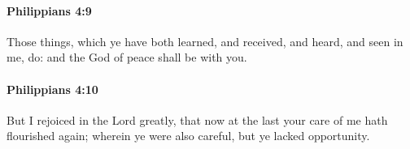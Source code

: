 		\paragraph{Philippians 4:9} %
			\label{PHILIPPIANS-4-9}

			Those things, which ye have both learned, and received, and heard, and seen in me, do: and the God of peace shall be with you.

			\begin{framed}
			\scriptsize
				\begin{compactdesc}
					\item[SBLG] 
				\end{compactdesc}
			\end{framed}

		\paragraph{Philippians 4:10} %
			\label{PHILIPPIANS-4-10}

			But I rejoiced in the Lord greatly, that now at the last your care of me hath flourished again; wherein ye were also careful, but ye lacked opportunity.

